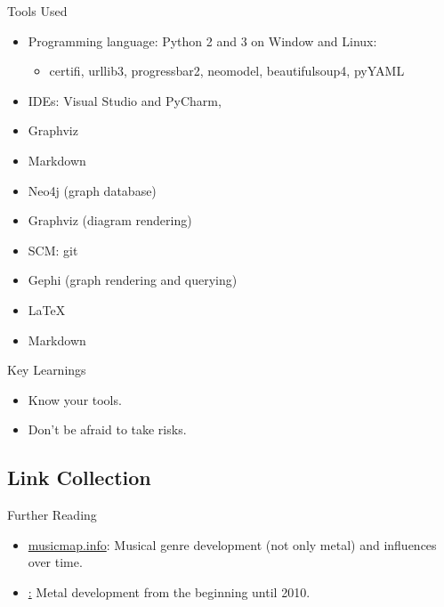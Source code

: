\documentclass{beamer}
\begin{document}
    \begin{frame}{Tools Used}
      \begin{itemize}
        \item<1-> Programming language: Python 2 and 3 on Window and Linux:
          \begin{itemize}
            \item<1-> certifi, urllib3, progressbar2, neomodel, beautifulsoup4, pyYAML

          \end{itemize}
        \item<1-> IDEs: Visual Studio and PyCharm,
        \item<1-> Graphviz
        \item<1-> Markdown
        \item<1-> Neo4j (graph database)
        \item<1-> Graphviz (diagram rendering)
        \item<1-> SCM: git
        \item<1-> Gephi (graph rendering and querying)
        \item<1-> \LaTeX{}
        \item<1-> Markdown
      \end{itemize}
    \end{frame}
    
    \begin{frame}{Key Learnings}
    
      \begin{itemize}
        \item<1-> Know your tools.
        \item<1-> Don't be afraid to take risks.
      \end{itemize}
      
    \end{frame}
    
  \subsection{Link Collection}

    \begin{frame}{Further Reading}
      \begin{itemize}
        \item\href{https://musicmap.info/}{musicmap.info}: Musical genre development (not only metal) and influences over time.
        \item\href{https://www.boundbymetal.com/en/common/metal-genres-graph/}: Metal development from the beginning until 2010.
      \end{itemize}
    \end{frame}
\end{document}
